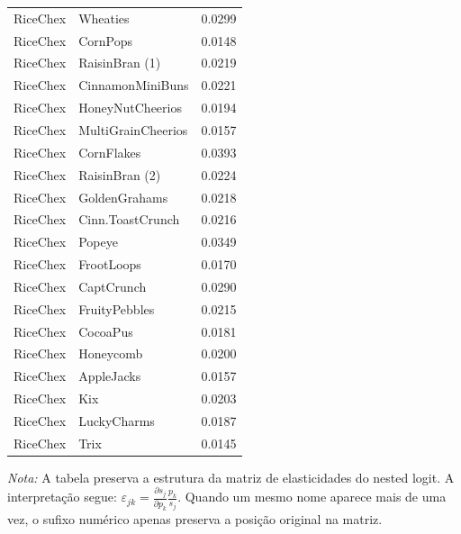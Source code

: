 \begin{table}[H]
\begin{tabular}{llr}
RiceChex & Wheaties & 0.0299 \\
RiceChex & CornPops & 0.0148 \\
RiceChex & RaisinBran (1) & 0.0219 \\
RiceChex & CinnamonMiniBuns & 0.0221 \\
RiceChex & HoneyNutCheerios & 0.0194 \\
RiceChex & MultiGrainCheerios & 0.0157 \\
RiceChex & CornFlakes & 0.0393 \\
RiceChex & RaisinBran (2) & 0.0224 \\
RiceChex & GoldenGrahams & 0.0218 \\
RiceChex & Cinn.ToastCrunch & 0.0216 \\
RiceChex & Popeye & 0.0349 \\
RiceChex & FrootLoops & 0.0170 \\
RiceChex & CaptCrunch & 0.0290 \\
RiceChex & FruityPebbles & 0.0215 \\
RiceChex & CocoaPus & 0.0181 \\
RiceChex & Honeycomb & 0.0200 \\
RiceChex & AppleJacks & 0.0157 \\
RiceChex & Kix & 0.0203 \\
RiceChex & LuckyCharms & 0.0187 \\
RiceChex & Trix & 0.0145 \\
\bottomrule
\end{tabular}

\vspace{0.3em}
\footnotesize
\textit{Nota:} A tabela preserva a estrutura da matriz de elasticidades do nested logit. A interpretação segue: $\varepsilon_{jk}=\frac{\partial s_j}{\partial p_k}\frac{p_k}{s_j}$. Quando um mesmo nome aparece mais de uma vez, o sufixo numérico apenas preserva a posição original na matriz.
\end{table}
\endgroup


